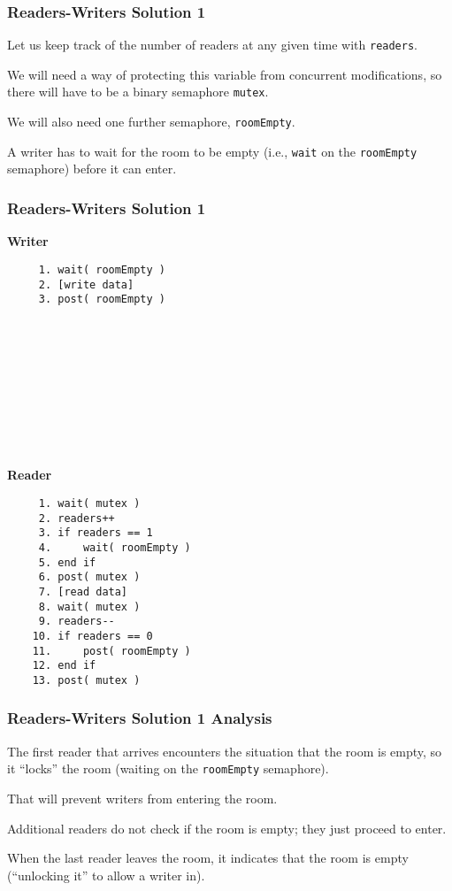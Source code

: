 \begin{frame}
	\frametitle{Readers-Writers Solution 1}
	Let us keep track of the number of readers at any given time with \texttt{readers}.

	We will need a way of protecting this variable from concurrent modifications, so there will have to be a binary semaphore \texttt{mutex}.

	We will also need one further semaphore, \texttt{roomEmpty}.

	A writer has to wait for the room to be empty (i.e., \texttt{wait} on the \texttt{roomEmpty} semaphore) before it can enter.
\end{frame}



\begin{frame}[fragile]
	\frametitle{Readers-Writers Solution 1}

	\begin{multicols}{2}
		\textbf{Writer}
		\begin{verbatim}
	 1. wait( roomEmpty )
	 2. [write data]
	 3. post( roomEmpty )
	 
	 
	 
	 
	 
	 
	 
	 
	 
	 
  		\end{verbatim}
		\columnbreak
		\textbf{Reader}\vspace{-2em}
		\begin{verbatim}
	 1. wait( mutex )
	 2. readers++
	 3. if readers == 1
	 4.     wait( roomEmpty )
	 5. end if
	 6. post( mutex )
	 7. [read data]
	 8. wait( mutex )
	 9. readers--
	10. if readers == 0
	11.     post( roomEmpty )
	12. end if
	13. post( mutex )
  		\end{verbatim}
	\end{multicols}
	\vspace{-2em}

\end{frame}

\begin{frame}
	\frametitle{Readers-Writers Solution 1 Analysis}

	The first reader that arrives encounters the situation that the room is empty, so it ``locks'' the room (waiting on the \texttt{roomEmpty} semaphore).

	That will prevent writers from entering the room.

	Additional readers do not check if the room is empty; they just proceed to enter.

	When the last reader leaves the room, it indicates that the room is empty (``unlocking it'' to allow a writer in).

\end{frame}

